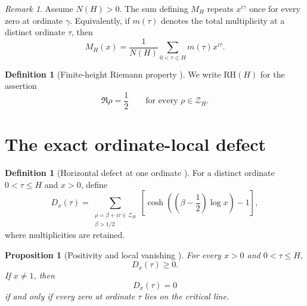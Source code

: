 \documentclass[11pt]{amsart}
\numberwithin{equation}{section}
\theoremstyle{plain}
\newtheorem{proposition}[theorem]{Proposition}
\theoremstyle{definition}
\newtheorem{definition}[theorem]{Definition}
\theoremstyle{remark}
\newtheorem{remark}[theorem]{Remark}
\newcommand{\RH}{\mathrm{RH}}
\begin{document}
\begin{remark}
\label{rem:multiplicity}
Assume $N(H)>0$.
The sum defining $M_H$ repeats $x^{i\gamma}$ once for every zero at ordinate $\gamma$.  Equivalently, if $m(\tau)$ denotes the total multiplicity at a distinct ordinate $\tau$, then
\begin{equation}
M_H(x)
=
\frac{1}{N(H)}
\sum_{0<\tau\leq H}m(\tau)x^{i\tau}.
\label{eq:MH_grouped}
\end{equation}
\end{remark}

\begin{definition}[Finite-height Riemann property {\normalfont[Definition]}]
\label{def:RH_H}
We write $\RH(H)$ for the assertion
\begin{equation}
\Re\rho=\frac12
\qquad
\text{for every }\rho\in\mathcal Z_H.
\label{eq:RH_H_definition}
\end{equation}
\end{definition}

\section{The exact ordinate-local defect}
\label{sec:atomic_defect}

\begin{definition}[Horizontal defect at one ordinate {}]
\label{def:Dx}
For a distinct ordinate $0<\tau\leq H$ and $x>0$, define
\begin{equation}
D_x(\tau)
=
\sum_{\substack{\rho=\beta+i\tau\in\mathcal Z_H\\\beta>1/2}}
\left[
\cosh\left(\left(\beta-\frac12\right)\log x\right)-1
\right],
\label{eq:Dx_definition}
\end{equation}
where multiplicities are retained.
\end{definition}

\begin{proposition}[Positivity and local vanishing {\normalfont[Unconditional]}]
\label{prop:Dx_positivity}
For every $x>0$ and $0<\tau\leq H$,
\begin{equation}
D_x(\tau)\geq0.
\label{eq:Dx_nonnegative}
\end{equation}
If $x\neq1$, then
\begin{equation}
D_x(\tau)=0
\label{eq:Dx_zero}
\end{equation}
if and only if every zero at ordinate $\tau$ lies on the critical line.
\end{proposition}
\end{document}
